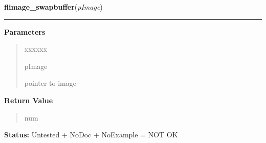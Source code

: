 \hspace{.8\funcindent}\begin{boxedminipage}{\funcwidth}

    \raggedright \textbf{flimage\_swapbuffer}(\textit{pImage})

    \vspace{-1.5ex}

    \rule{\textwidth}{0.5\fboxrule}
\setlength{\parskip}{2ex}
\setlength{\parskip}{1ex}
      \textbf{Parameters}
      \vspace{-1ex}

      \begin{quote}
        \begin{Ventry}{xxxxxx}

          \item[pImage]

          pointer to image

        \end{Ventry}

      \end{quote}

      \textbf{Return Value}
    \vspace{-1ex}

      \begin{quote}
      num

      \end{quote}

\textbf{Status:} Untested + NoDoc + NoExample = NOT OK



    \end{boxedminipage}

    \label{xformslib:library:flimage_to_ximage}

    \vspace{0.5ex}

